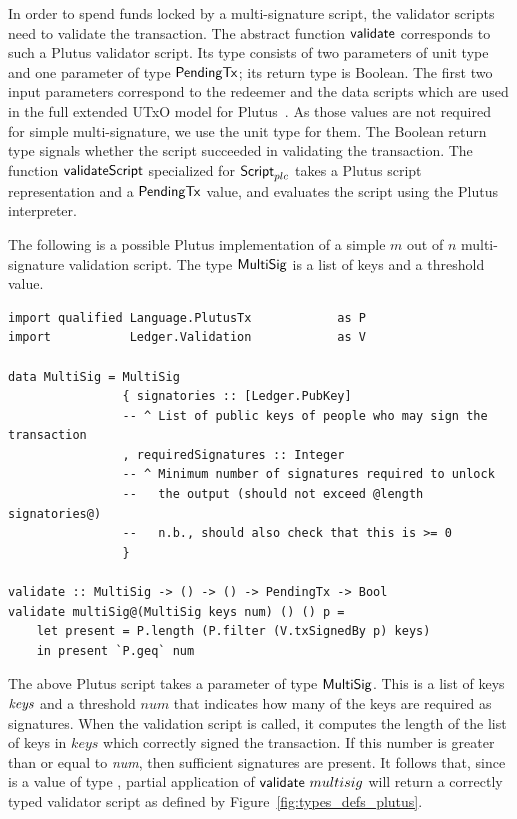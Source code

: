 \documentclass[11pt,a4paper,dvipsnames,twosided]{article}
\newcommand{\Script}{\type{Script}}
\newcommand{\ScriptPlutus}{\Script_{plc}}
\newcommand{\PendingTx}{\type{PendingTx}}
\theoremstyle{definition}
\begin{document}
In order to spend funds locked by a multi-signature script, the validator
scripts need to validate the transaction. The abstract function $\mathsf{validate}$
corresponds to such a Plutus validator script. Its type consists of two
parameters of unit type and one parameter of type $\PendingTx$; its return type
is Boolean. The first two input parameters correspond to the redeemer and the
data scripts which are used in the full extended UTxO model for
Plutus~\cite{plutus_eutxo}. As those values are not required for simple
multi-signature, we use the unit type for them. The Boolean return type signals
whether the script succeeded in validating the transaction. The function
$\mathsf{validateScript}$ specialized for $\ScriptPlutus$ takes a Plutus script
representation and a $\PendingTx$ value, and evaluates the script using the
Plutus interpreter.

The following is a possible Plutus implementation of a simple $m$ out of $n$
multi-signature validation script. The type $\mathsf{MultiSig}$ is a list of keys
and a threshold value.

\begin{verbatim}
import qualified Language.PlutusTx            as P
import           Ledger.Validation            as V

data MultiSig = MultiSig
                { signatories :: [Ledger.PubKey]
                -- ^ List of public keys of people who may sign the transaction
                , requiredSignatures :: Integer
                -- ^ Minimum number of signatures required to unlock
                --   the output (should not exceed @length signatories@)
                --   n.b., should also check that this is >= 0
                }

validate :: MultiSig -> () -> () -> PendingTx -> Bool
validate multiSig@(MultiSig keys num) () () p =
    let present = P.length (P.filter (V.txSignedBy p) keys)
    in present `P.geq` num
\end{verbatim}

The above Plutus script takes a parameter  of type
$\mathsf{MultiSig}$.  This is a list of keys $\mathit{keys}$ and a threshold $num$
that indicates how many of the keys are required as signatures. When the
validation script is called, it computes the length of the list of keys in $keys$ which correctly signed
the transaction. If this number is greater than or equal to \emph{num},
then sufficient signatures are present. It follows that, since
 is a value of type , partial application of
$\mathsf{validate}~multisig$ will return a correctly typed validator script
as defined by Figure~\ref{fig:types_defs_plutus}.
\end{document}
